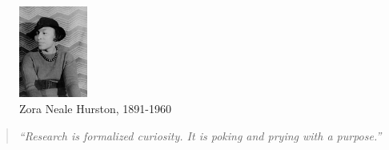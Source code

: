 \documentclass[
  12pt,
  oneside]{book}
\theoremstyle{definition}
\theoremstyle{definition}
\theoremstyle{definition}
\theoremstyle{definition}
\theoremstyle{remark}
\begin{document}
\begin{figure}
\centering
\includegraphics[width=0.2\textwidth,height=\textheight]{fig/Zora_Neale_Hurston.jpg}
\caption[\label{fig:hurston} Zora Neale Hurston, 1891-1960]{\label{fig:hurston} Zora Neale Hurston, 1891-1960\footnotemark{}}
\end{figure}

\begin{quote}
\emph{``Research is formalized curiosity. It is poking and prying with a purpose.''} \citep{Hurston2010Dust}
\end{quote}
\end{document}
